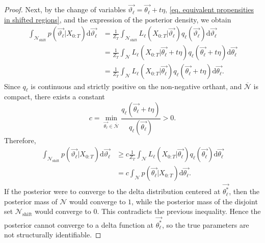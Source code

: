 \documentclass[pdflatex,sn-mathphys-num]{sn-jnl}%
\def\dd{\text{d}}
\theoremstyle{thmstyleone}%
\theoremstyle{thmstyletwo}%
\theoremstyle{thmstylethree}%
\begin{document}
\begin{appendices}
\begin{proof}
    Next, by the change of variables $\overrightarrow{\vartheta_\ell} = \overrightarrow{\theta_\ell} + t\eta$, \eqref{eq. equivalent propensities in shifted regions}, and the expression of the posterior density, we obtain
    \begin{align*}
        \int_{\mathcal N_\text{shift}} p\left(\overrightarrow{\vartheta_\ell} \big| X_{0:T}\right) \dd \overrightarrow{\vartheta_\ell}
        &= \frac{1}{Z_T}
        \int_{\mathcal N_\text{shift}} L_\ell\left(X_{0:T}\big|\overrightarrow{\vartheta_\ell}\right)
        q_\ell\left(\overrightarrow{\vartheta_\ell}\right) \dd \overrightarrow{\vartheta_\ell} \\
        &= \frac{1}{Z_T}
        \int_{\mathcal N} L_\ell\left(X_{0:T}\big|\overrightarrow{\theta_\ell}+t\eta\right)
        q_\ell\left(\overrightarrow{\theta_\ell}+t\eta\right) \dd \overrightarrow{\theta_\ell} \\
        &= \frac{1}{Z_T}
        \int_{\mathcal N} L_\ell\left(X_{0:T}\big|\overrightarrow{\theta_\ell}\right)
        q_\ell\left(\overrightarrow{\theta_\ell}+t\eta\right) \dd \overrightarrow{\theta_\ell}.
    \end{align*}
    Since $q_\ell$ is continuous and strictly positive on the non-negative orthant, and $\overline{\mathcal N}$ is compact, there exists a constant
    \[
        c = \min_{\overrightarrow{\theta_\ell}\in\overline{\mathcal N}}
        \frac{q_\ell\left(\overrightarrow{\theta_\ell}+t\eta\right)}{q_\ell\left(\overrightarrow{\theta_\ell}\right)} > 0.
    \]
    Therefore,
    \begin{align*}
        \int_{\mathcal N_\text{shift}} p\left(\overrightarrow{\vartheta_\ell} \big| X_{0:T}\right) \dd \overrightarrow{\vartheta_\ell}
        &\geq c \frac{1}{Z_T}
        \int_{\mathcal N} L_\ell\left(X_{0:T}\big|\overrightarrow{\theta_\ell}\right)
        q_\ell\left(\overrightarrow{\theta_\ell}\right) \dd \overrightarrow{\theta_\ell} \\
        &= c \int_{\mathcal N} p\left(\overrightarrow{\theta_\ell} \big| X_{0:T}\right) \dd \overrightarrow{\theta_\ell}.
    \end{align*}
    If the posterior were to converge to the delta distribution centered at $\overrightarrow{\theta^*_\ell}$, then the posterior mass of $\mathcal N$ would converge to $1$, while the posterior mass of the disjoint set $\mathcal N_\text{shift}$ would converge to $0$.
    This contradicts the previous inequality.
    Hence the posterior cannot converge to a delta function at $\overrightarrow{\theta^*_\ell}$, so the true parameters are not structurally identifiable.
    \end{proof}


\end{appendices}
\end{document}
